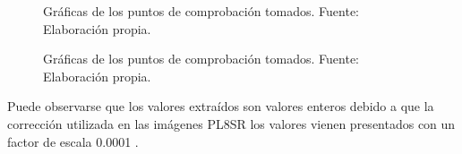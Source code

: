 \begin{figure}
\caption[Gráficas puntos de comprobación]{Gráficas de los puntos de comprobación tomados. Fuente: Elaboración propia.}
\label{fig:puntos_comprob}	
\end{figure}

\begin{figure}
\centering
{}
\caption[Gráficas puntos de comprobación]{Gráficas de los puntos de comprobación tomados. Fuente: Elaboración propia.}
\label{fig:puntos_comprob2}
\end{figure}

Puede observarse que los valores extraídos son valores enteros debido a que la corrección utilizada en las imágenes \ac{PL8SR} los valores vienen presentados con un factor de escala 0.0001 \citep{USGS2015}.